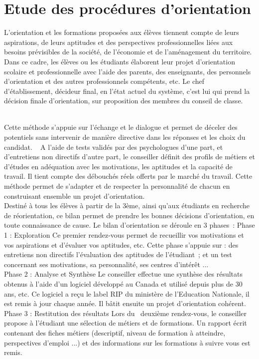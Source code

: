 \section{Etude des procédures d’orientation }
L’orientation et les formations proposées  aux élèves tiennent compte de leurs  aspirations, de leurs aptitudes et des  perspectives professionnelles liées aux besoins  prévisibles de la société, de l’économie et de  l’aménagement du territoire. \\
Dans ce cadre,  les élèves ou les étudiants élaborent leur projet d’orientation  scolaire et professionnelle avec l’aide des  parents, des enseignants, des personnels  d’orientation et des autres professionnels compétents, etc. Le chef d’établissement, décideur final, en l’état actuel du système, c’est lui qui prend la décision finale d’orientation, sur  proposition des membres du conseil de classe.
\begin{itemize}[label=\textbullet]
	 \\
	Cette méthode s’appuie sur l’échange et le dialogue et permet de déceler des potentiels sans intervenir de manière directive dans les réponses et les choix du candidat.
 
           A l’aide de tests validés par des psychologues d’une part, et d’entretiens non directifs d’autre part, le conseiller définit des profils de métiers et d’études en adéquation avec les motivations, les aptitudes et la capacité de travail. Il tient compte des débouchés réels offerts par le marché du travail. Cette méthode permet de s’adapter et de respecter la personnalité de chacun en construisant ensemble un projet d’orientation.
	 \\
	
	Destiné à tous les élèves à partir de la 3ème, ainsi qu'aux étudiants en recherche de réorientation, ce bilan permet de prendre les bonnes décisions d’orientation, en toute connaissance de cause. Le bilan d'orientation se déroule en 3 phases :
Phase 1 : Exploration
Ce premier rendez-vous permet de recueillir vos motivations et vos aspirations et d'évaluer vos aptitudes, etc. Cette phase s’appuie sur : des entretiens non directifs
 l'évaluation des aptitudes de l’étudiant ;  et un test concernant ses motivations, sa personnalité, ses  centres d'intérêt ...  \\
Phase 2 : Analyse et Synthèse
Le conseiller effectue une synthèse des résultats obtenus à l’aide d'un logiciel développé au Canada et utilisé depuis plus de 30 ans, etc. Ce logiciel a reçu le label \ac{RIP}  du ministère de l'Education Nationale, il est remis à jour chaque année. Il bâtit ensuite un projet d’orientation cohérent. \\
Phase 3 : Restitution des résultats
Lors du  deuxième rendez-vous, le conseiller propose à l’étudiant une sélection de métiers et de formations. Un rapport écrit contenant des fiches métiers (descriptif, niveau de formation à atteindre, perspectives d'emploi ...) et des informations sur les formations à suivre vous est remis.

\end{itemize}

